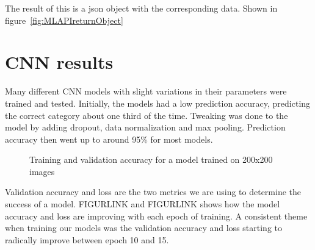 The result of this is a json object with the corresponding data.
Shown in figure~\ref{fig:MLAPIreturnObject}

\section{CNN results}\label{sec:cnn-results}
Many different CNN models with slight variations in their parameters were trained and tested.
Initially, the models had a low prediction accuracy, predicting the correct category about one third of the time.
Tweaking was done to the model by adding dropout, data normalization and max pooling.
Prediction accuracy then went up to around 95\% for most models.

\begin{figure}[h]
    \caption{Training and validation accuracy for a model trained on 200x200 images}
    \label{fig:200modelaccuracy}
\end{figure}

Validation accuracy and loss are the two metrics we are using to determine the success of a model.
FIGURLINK and FIGURLINK shows how the model accuracy and loss are improving with each epoch of training.
A consistent theme when training our models was the validation accuracy and loss starting to radically improve between epoch 10 and 15.

